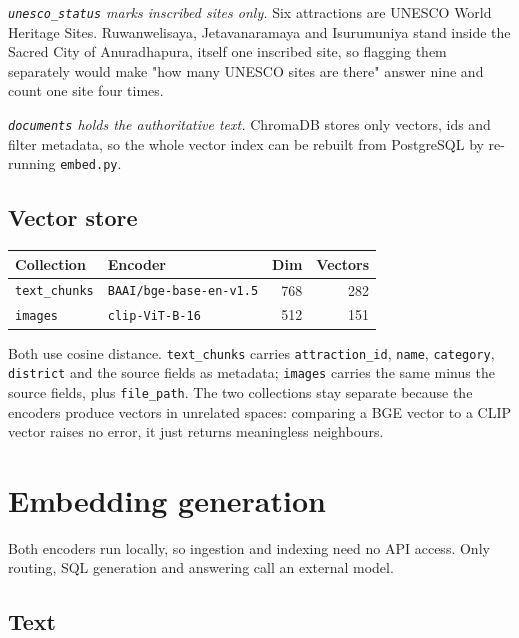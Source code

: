 \documentclass[11pt,a4paper]{article}
\newcommand{\code}[1]{\texttt{\small #1}}
\begin{document}
\textit{\code{unesco\_status} marks inscribed sites only.} Six attractions are
UNESCO World Heritage Sites. Ruwanwelisaya, Jetavanaramaya and Isurumuniya
stand inside the Sacred City of Anuradhapura, itself one inscribed site, so
flagging them separately would make "how many UNESCO sites are there" answer
nine and count one site four times.

\textit{\code{documents} holds the authoritative text.} ChromaDB stores only
vectors, ids and filter metadata, so the whole vector index can be rebuilt
from PostgreSQL by re-running \code{embed.py}.

\subsection{Vector store}

\begin{center}
\small
\begin{tabular}{@{}llrr@{}}
\toprule
\textbf{Collection} & \textbf{Encoder} & \textbf{Dim} & \textbf{Vectors} \\
\midrule
\code{text\_chunks} & \code{BAAI/bge-base-en-v1.5} & 768 & 282 \\
\code{images}       & \code{clip-ViT-B-16}         & 512 & 151 \\
\bottomrule
\end{tabular}
\end{center}

Both use cosine distance. \code{text\_chunks} carries \code{attraction\_id},
\code{name}, \code{category}, \code{district} and the source fields as
metadata; \code{images} carries the same minus the source fields, plus
\code{file\_path}. The two collections stay separate because the encoders
produce vectors in unrelated spaces: comparing a BGE vector to a CLIP vector
raises no error, it just returns meaningless neighbours.

\section{Embedding generation}

Both encoders run locally, so ingestion and indexing need no API access. Only
routing, SQL generation and answering call an external model.

\subsection{Text}
\end{document}
